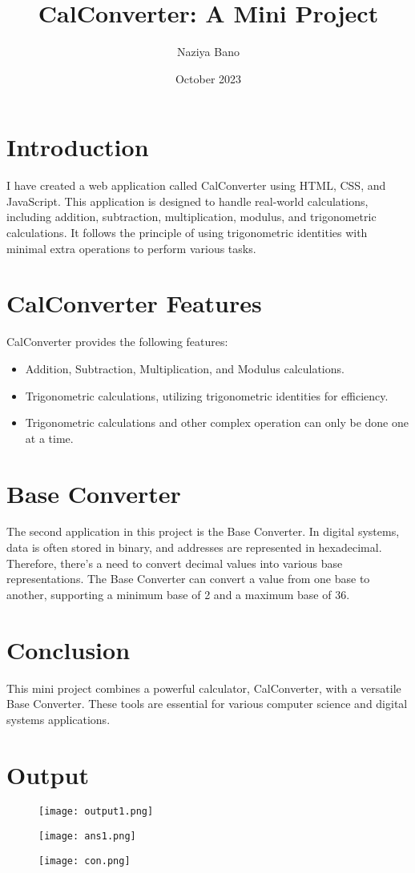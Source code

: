 \documentclass{report}
\title{CalConverter: A Mini Project}
\author{Naziya Bano}
\date{October 2023}
\begin{document}
\maketitle

\section{Introduction}
I have created a web application called CalConverter using HTML, CSS, and JavaScript. This application is designed to handle real-world calculations, including addition, subtraction, multiplication, modulus, and trigonometric calculations. It follows the principle of using trigonometric identities with minimal extra operations to perform various tasks.

\section{CalConverter Features}
CalConverter provides the following features:

\begin{itemize}
    \item Addition, Subtraction, Multiplication, and Modulus calculations.
    \item Trigonometric calculations, utilizing trigonometric identities for efficiency.
     \item Trigonometric calculations and other complex operation can only be done one at a time.
\end{itemize}

\section{Base Converter}
The second application in this project is the Base Converter. In digital systems, data is often stored in binary, and addresses are represented in hexadecimal. Therefore, there's a need to convert decimal values into various base representations. The Base Converter can convert a value from one base to another, supporting a minimum base of 2 and a maximum base of 36.

\section{Conclusion}
This mini project combines a powerful calculator, CalConverter, with a versatile Base Converter. These tools are essential for various computer science and digital systems applications.
\section{Output}
\begin{figure}[h]
    \centering
    \texttt{[image: output1.png]}
\end{figure}
\begin{figure}[h]
    \centering
    \texttt{[image: ans1.png]}
\end{figure}
\begin{figure}[h]
    \centering
    \texttt{[image: con.png]}
\end{figure}
\end{document}
